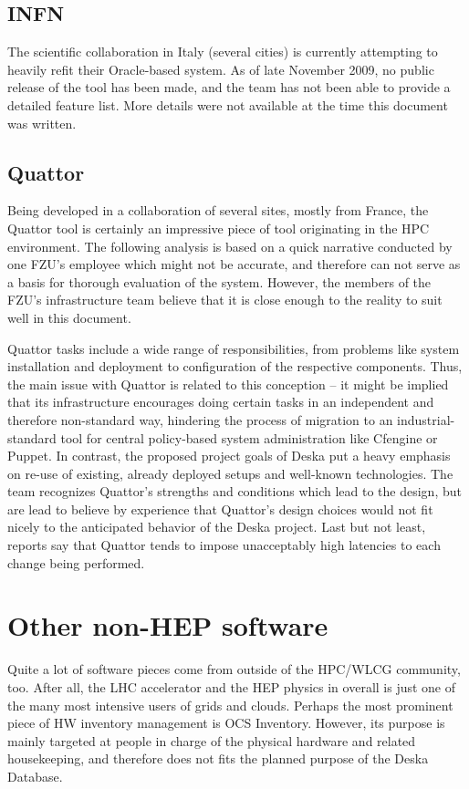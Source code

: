 \documentclass[12pt]{article}
\begin{document}
\subsection{INFN}
The scientific collaboration in Italy (several cities) is currently attempting to heavily refit their Oracle-based system.  As
of late November 2009, no public release of the tool has been made, and the team has not been able to provide a detailed feature
list.  More details were not available at the time this document was written.

\subsection{Quattor}
Being developed in a collaboration of several sites, mostly from France, the Quattor tool is certainly an impressive piece of tool
originating in the HPC environment.  The following analysis is based on a quick narrative conducted by one FZU's employee which
might not be accurate, and therefore can not serve as a basis for thorough evaluation of the system.  However, the members of the
FZU's infrastructure team believe that it is close enough to the reality to suit well in this document.

Quattor tasks include a wide range of responsibilities, from problems like system installation and deployment to configuration of
the respective components.  Thus, the main issue with Quattor is related to this conception -- it might be implied that its
infrastructure encourages doing certain tasks in an independent and therefore non-standard way, hindering the process of migration
to an industrial-standard tool for central policy-based system administration like Cfengine or Puppet.  In contrast, the proposed
project goals of Deska put a heavy emphasis on re-use of existing, already deployed setups and well-known technologies.  The team
recognizes Quattor's strengths and conditions which lead to the design, but are lead to believe by experience that Quattor's
design choices would not fit nicely to the anticipated behavior of the Deska project.  Last but not least, reports say that
Quattor tends to impose unacceptably high latencies to each change being performed.

\section{Other non-HEP software}
Quite a lot of software pieces come from outside of the HPC/WLCG community, too.  After all, the LHC accelerator and the HEP
physics in overall is just one of the many most intensive users of grids and clouds.  Perhaps the most prominent piece of HW
inventory management is OCS Inventory.  However, its purpose is mainly targeted at people in charge of the physical hardware and
related housekeeping, and therefore does not fits the planned purpose of the Deska Database.
\end{document}
